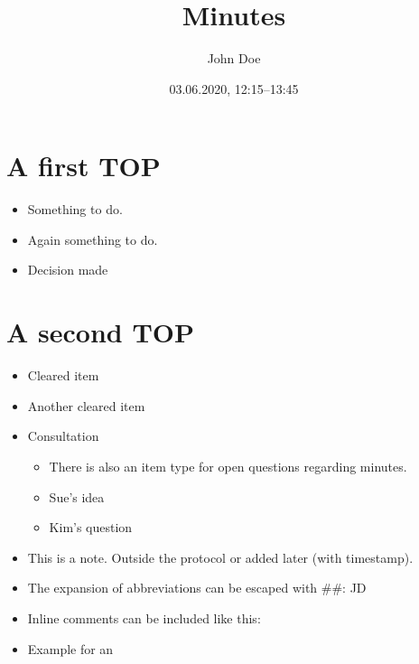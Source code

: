 \documentclass[11pt]{article}
\author{John Doe}
\date{03.06.2020, 12:15--13:45}
\title{Minutes}
\begin{document}
\maketitle
\tableofcontents

\section{\texorpdfstring{}{}A first TOP}
\label{sec:orgeaec009}
\begin{itemize}
\item {} Something to do.
\item \ActionTag{}{::} \ActionTagMargin{}Again something to do.
\item \EntscheidungTag{}{::} \EntscheidungTagMargin{ }Decision made
\end{itemize}
\section{A second TOP}
\label{sec:orgd0e3582}
\begin{itemize}
\item {} Cleared item
\item \ClearedTag{}{::} \ClearedTagMargin{ }Another cleared item
\item \ConsultationTag{}{::} \ConsultationTagMargin{ }Consultation 
\begin{itemize}
\item \QuestionTag{}{::}There is also an item type for open questions regarding minutes.
\item {}Sue's idea
\item {}Kim's question
\end{itemize}
\item \NoteTag{\textit{{[}2020-06-03 Wed 10:39]}}{}{::}This is a note. Outside the protocol or added later (with timestamp).
\item The expansion of abbreviations can be escaped with \#{}\#: JD
\item Inline comments can be included like this: 
\item Example for an 
\end{itemize}
\end{document}
